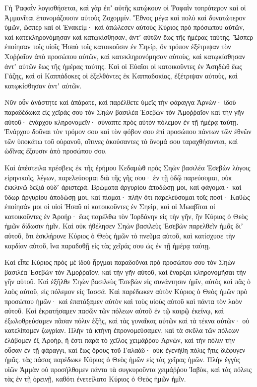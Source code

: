 {Γὴ Ῥαφαῒν λογισθήσεται, καὶ γὰρ ἐπʼ αὐτῆς κατῴκουν οἱ Ῥαφαῒν τοπρότερον καὶ οἱ Ἀμμανῖται ἐπονομάζουσιν αὐτοὺς Ζοχομμίν.
Ἔθνος μέγα καὶ πολὺ καὶ δυνατώτερον ὑμῶν, ὥσπερ καὶ οἱ Ἐνακείμ· καὶ ἀπώλεσεν αὐτοὺς Κύριος πρὸ πρόσωπου αὐτῶν, καὶ κατεκληρονόμησαν καὶ κατῳκίσθησαν, ἀντʼ αὐτῶν ἕως τῆς ἡμέρας ταύτης.
Ὥσπερ ἐποίησαν τοῖς υἱοῖς Ἡσαὺ τοῖς κατοικοῦσιν ἐν Σηείρ, ὃν τρόπον ἐξέτριψαν τὸν Χοῤῥαῖον ἀπὸ προσώπου αὐτῶν, καὶ κατεκληρονόμησαν αὐτοὺς, καὶ κατῳκίσθησαν ἀντʼ αὐτῶν ἕως τῆς ἡμέρας ταύτης.
Καὶ οἱ Εὐαῖοι οἱ κατοικοῦντες ἐν Ἀσηδὼθ ἕως Γάζης, καὶ οἱ Καππάδοκες οἱ ἐξελθόντες ἐκ Καππαδοκίας, ἐξέτριψαν αὐτοὺς, καὶ κατῳκίσθησαν ἀντʼ αὐτῶν.
\par }{\PP {}Νῦν οὖν ἀνάστητε καὶ ἀπάρατε, καὶ παρέλθετε ὑμεῖς τὴν φάραγγα Ἀρνών· ἰδοὺ παραδέδωκα εἰς χεῖράς σου τὸν Σηὼν βασιλέα Ἐσεβὼν τὸν Ἀμοῤῥαῖον καὶ τὴν γῆν αὐτοῦ· ἐνάρχου κληρονομεῖν· σύναπτε πρὸς αὐτὸν πόλεμον ἐν τῇ ἡμέρᾳ ταύτῃ.
Ἐνάρχου δοῦναι τὸν τρόμον σου καὶ τὸν φόβον σου ἐπὶ προσώπου πάντων τῶν ἐθνῶν τῶν ὑποκάτω τοῦ οὐρανοῦ, οἵτινες ἀκούσαντες τὸ ὄνομά σου ταραχθήσονται, καὶ ὠδῖνας ἕξουσιν ἀπὸ προσώπου σου.
\par }{\PP {}Καὶ ἀπέστειλα πρέσβεις ἐκ τῆς ἐρήμου Κεδαμὼθ πρὸς Σηὼν βασιλέα Ἐσεβὼν λόγοις εἰρηνικοῖς, λέγων,
παρελεύσομαι διὰ τῆς γῆς σου· ἐν τῇ ὁδῷ παρεύσομαι, οὐκ ἐκκλινῶ δεξιὰ οὐδʼ ἀριστερά.
Βρώματα ἀργυρίου ἀποδώσῃ μοι, καὶ φάγομαι· καὶ ὕδωρ ἀργυρίου ἀποδώσῃ μοι, καὶ πίομαι· πλὴν ὅτι παρελεύσομαι τοῖς ποσί·
Καθὼς ἐποίησάν μοι οἱ υἱοὶ Ἠσαῦ οἱ κατοικοῦντες ἐν Σηεὶρ, καὶ οἱ Μωαβῖται οἱ κατοικοῦντες ἐν Ἀροήρ· ἕως παρέλθω τὸν Ἰορδάνην εἰς τὴν γῆν, ἣν Κύριος ὁ Θεὸς ἡμῶν δίδωσιν ἡμῖν.
Καὶ οὐκ ἠθέλησεν Σηὼν βασιλεὺς Ἐσεβὼν παρελθεῖν ἡμᾶς διʼ αὐτοῦ, ὅτι ἐσκλήρυνε Κύριος ὁ Θεὸς ἡμῶν τὸ πνεῦμα αὐτοῦ, καὶ κατίσχυσε τὴν καρδίαν αὐτοῦ, ἵνα παραδοθῇ εἰς τὰς χεῖράς σου ὡς ἐν τῇ ἡμέρᾳ ταύτῃ.
\par }{\PP {}Καὶ εἶπε Κύριος πρὸς μέ ἰδοὺ ἦργμαι παραδοῦναι πρὸ προσώπου σου τὸν Σηὼν βασιλέα Ἐσεβὼν τὸν Ἀμοῤῥαῖον, καὶ τὴν γῆν αὐτοῦ, καὶ ἔναρξαι κληρονομῆσαι τὴν γῆν αὐτοῦ.
Καὶ ἐξῆλθε Σηὼν βασιλεὺς Ἐσεβὼν εἰς συνάντησιν ἡμῖν, αὐτὸς καὶ πᾶς ὁ λαὸς αὐτοῦ, εἰς πόλεμον εἰς Ἰασσά.
Καὶ παρέδωκεν αὐτὸν Κύριος ὁ Θεὸς ἡμῶν πρὸ προσώπου ἡμῶν· καὶ ἐπατάξαμεν αὐτὸν καὶ τοὺς υἱοὺς αὐτοῦ καὶ πάντα τὸν λαὸν αὐτοῦ.
Καὶ ἐκρατήσαμεν πασῶν τῶν πόλεων αὐτοῦ ἐν τῷ καιρῷ ἐκείνῳ, καὶ ἐξωλοθρεύσαμεν πᾶσαν πόλιν ἑξῆς, καὶ τὰς γυναῖκας αὐτῶν καὶ τὰ τέκνα αὐτῶν· οὐ κατελίπομεν ζωγρίαν.
Πλὴν τὰ κτήνη ἐπρονομεύσαμεν, καὶ τὰ σκῦλα τῶν πόλεων ἐλάβομεν
ἐξ Ἀροὴρ, ἥ ἐστι παρὰ τὸ χεῖλος χειμάῤῥου Ἀρνών, καὶ τὴν πόλιν τὴν οὖσαν ἐν τῇ φάραγγι, καὶ ἕως ὄρους τοῦ Γαλαάδ· οὐκ ἐγενήθη πόλις ἥτις διέφυγεν ἡμᾶς. τὰς πάσας παρέδωκε Κύριος ὁ Θεὸς ἡμῶν εἰς τὰς χεῖρας ἡμῶν.
Πλὴν ἐγγὺς υἱῶν Ἀμμὰν οὐ προσήλθομεν πάντα τὰ συγκυροῦντα χειμάῤῥου Ἰαβὸκ, καὶ τὰς πόλεις τὰς ἐν τῇ ὀρεινῇ, καθότι ἐνετείλατο Κύριος ὁ Θεὸς ἡμῶν ἡμῖν.

}
